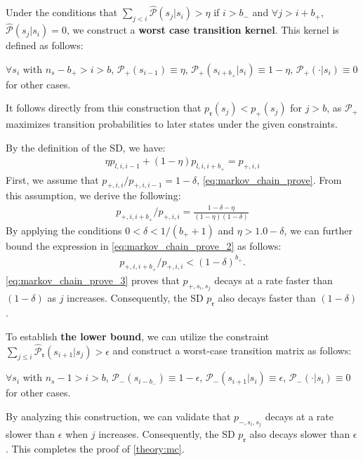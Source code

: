 \documentclass{article}
\begin{document}
Under the conditions that $\sum_{j<i} \hat{\mathcal{P}}(s_j|s_i) > \eta$ if $i > b_{-}$ and $\forall j > i+b_{+}$, $\hat{\mathcal{P}}(s_j|s_i) = 0$, we construct a \textbf{worst case transition kernel}. This kernel is defined as follows:
\begin{center}
$\forall s_i$ with $n_s-b_+>i>b$, $\mathcal{P}_+(s_{i-1}) \equiv \eta$, $\mathcal{P}_+(s_{i+b_{+}}|s_i) \equiv 1-\eta$, $\mathcal{P}_+(\cdot|s_i) \equiv 0$ for other cases.
\end{center}
It follows directly from this construction that $p_{\mathfrak{r}}(s_j) < p_+(s_j)$ for $j>b$, as $\mathcal{P}_+$ maximizes transition probabilities to later states under the given constraints.

By the definition of the SD, we have:
\begin{align}
    \eta p_{l,i,i-1} +(1-\eta)p_{l,i,i+b_+} = p_{+,i,i}
    \label{eq:markov_chain_prove}
\end{align}
First, we assume that $p_{+,i,i} / p_{+,i,i-1} = 1-\delta$, \cref{eq:markov_chain_prove}. From this assumption, we derive the following:
\begin{align}
    p_{+,i,i+b_+} / p_{+,i,i} =\frac{1-\delta-\eta}{(1-\eta)(1-\delta)}
    \label{eq:markov_chain_prove_2}
\end{align}
By applying the conditions $0 < \delta < 1/(b_++1)$ and $\eta > 1.0-\delta$, we can further bound the expression in \cref{eq:markov_chain_prove_2} as follows:
\begin{align}
    p_{+,i,i+b_+} / p_{+,i,i} < (1-\delta)^{b_+}.
    \label{eq:markov_chain_prove_3}
\end{align}
\cref{eq:markov_chain_prove_3} proves that $p_{+,s_i,s_j}$ decays at a rate faster than $(1-\delta)$ as $j$ increases. Consequently, the SD $p_{\mathfrak{r}}$ also decays faster than $(1-\delta)$.

To establish \textbf{the lower bound}, we can utilize the constraint $\sum_{j \le i} \hat{\mathcal{P}}_{\mathfrak{r}}(s_{i+1}|s_j) > \epsilon$ and construct a worst-case transition matrix as follows:
\begin{center}
$\forall s_i$ with $n_s-1>i>b$, $\mathcal{P}_-(s_{i-b_-}) \equiv 1-\epsilon$, $\mathcal{P}_-(s_{i+1}|s_i) \equiv \epsilon$, $\mathcal{P}_-(\cdot|s_i) \equiv 0$ for other cases. 
\end{center}
By analyzing this construction, we can validate that $p_{-,s_i,s_j}$ decays at a rate slower than $\epsilon$ when $j$ increases. Consequently, the SD $p_{\mathfrak{r}}$ also decays slower than $\epsilon$. This completes the proof of \cref{theory:mc}.
\end{document}
